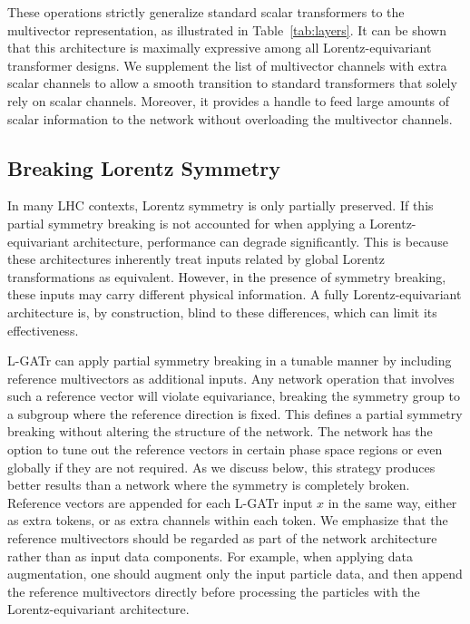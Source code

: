 \documentclass[submission, Phys]{SciPost}
\begin{document}
These operations strictly generalize standard scalar transformers to the multivector representation, as illustrated in Table~\ref{tab:layers}. It can be shown that this architecture is maximally expressive among all Lorentz-equivariant transformer designs. We supplement the list of multivector channels with extra scalar channels to allow a smooth transition to standard transformers that solely rely on scalar channels. Moreover, it provides a handle to feed large amounts of scalar information to the network without overloading the multivector channels.

\subsection{Breaking Lorentz Symmetry}
\label{sec:symmetrybreaking}

In many LHC contexts, Lorentz symmetry is only partially preserved. If this partial symmetry breaking is not accounted for when applying a Lorentz-equivariant architecture, performance can degrade significantly. This is because these architectures inherently treat inputs related by global Lorentz transformations as equivalent. However, in the presence of symmetry breaking, these inputs may carry different physical information. A fully Lorentz-equivariant architecture is, by construction, blind to these differences, which can limit its effectiveness.

L-GATr can apply partial symmetry breaking in a tunable manner by including reference multivectors as additional inputs. 
Any network operation that involves such a reference vector will violate equivariance, breaking the symmetry group to a subgroup where the reference direction is fixed. This defines a partial symmetry breaking without altering the structure of the network. The network has the option to tune out the reference vectors in certain phase space regions or even globally if they are not required. As we discuss below, this strategy produces better results than a network where the symmetry is completely broken. Reference vectors are appended for each L-GATr input $x$ in the same way, either as extra tokens, or as extra channels within each token. We emphasize that the reference multivectors should be regarded as part of the network architecture rather than as input data components. For example, when applying data augmentation, one should augment only the input particle data, and then append the reference multivectors directly before processing the particles with the Lorentz-equivariant architecture.
\end{document}
